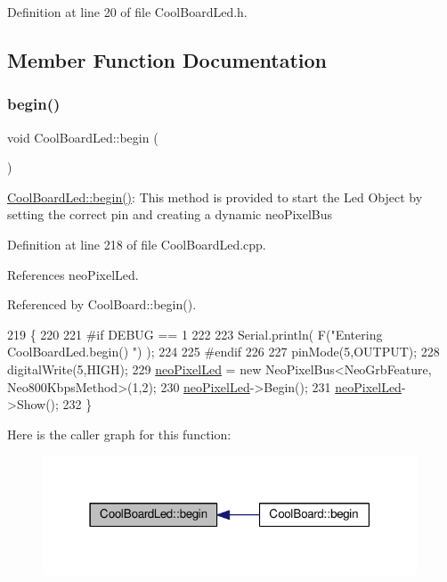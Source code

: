 Definition at line 20 of file Cool\+Board\+Led.\+h.



\subsection{Member Function Documentation}
\mbox{\label{classCoolBoardLed_ae3cbde8affcc6f011cbd698c8ef911f6}} 
\subsubsection{\texorpdfstring{begin()}{begin()}}
{\footnotesize\ttfamily void Cool\+Board\+Led\+::begin (\begin{DoxyParamCaption}{ }\end{DoxyParamCaption})}

\hyperlink{classCoolBoardLed_ae3cbde8affcc6f011cbd698c8ef911f6}{Cool\+Board\+Led\+::begin()}\+: This method is provided to start the Led Object by setting the correct pin and creating a dynamic neo\+Pixel\+Bus 

Definition at line 218 of file Cool\+Board\+Led.\+cpp.



References neo\+Pixel\+Led.



Referenced by Cool\+Board\+::begin().


\begin{DoxyCode}
219 \{
220 
221 \textcolor{preprocessor}{#if DEBUG == 1}
222 
223     Serial.println( F(\textcolor{stringliteral}{"Entering CoolBoardLed.begin() "}) );
224 
225 \textcolor{preprocessor}{#endif}
226 
227     pinMode(5,OUTPUT);
228     digitalWrite(5,HIGH);
229     \hyperlink{classCoolBoardLed_ac2c13fa462a010cd9242bf297c013923}{neoPixelLed} = \textcolor{keyword}{new} NeoPixelBus<NeoGrbFeature, Neo800KbpsMethod>(1,2); 
230     \hyperlink{classCoolBoardLed_ac2c13fa462a010cd9242bf297c013923}{neoPixelLed}->Begin();
231     \hyperlink{classCoolBoardLed_ac2c13fa462a010cd9242bf297c013923}{neoPixelLed}->Show();
232 \} 
\end{DoxyCode}
Here is the caller graph for this function\+:\nopagebreak
\begin{figure}[H]
\begin{center}
\leavevmode
\includegraphics[width=315pt]{classCoolBoardLed_ae3cbde8affcc6f011cbd698c8ef911f6_icgraph}
\end{center}
\end{figure}
\mbox{\label{classCoolBoardLed_a27706bc029f6a126c55d0b91624ad7fa}} 
